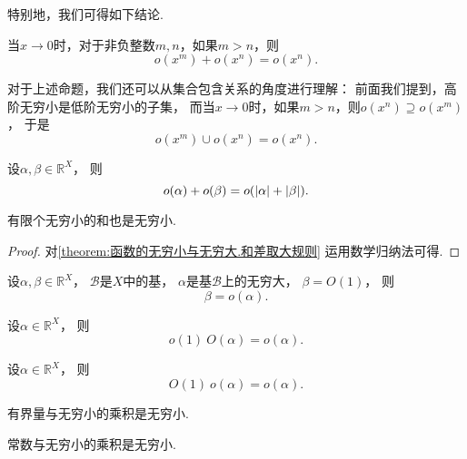 特别地，我们可得如下结论.
\begin{corollary}
当\(x\to0\)时，对于非负整数\(m,n\)，如果\(m>n\)，则\[
	o(x^m) + o(x^n) = o(x^n).
\]
\end{corollary}
\begin{remark}
对于上述命题，我们还可以从集合包含关系的角度进行理解：
前面我们提到，高阶无穷小是低阶无穷小的子集，
而当\(x\to0\)时，如果\(m>n\)，则\(o(x^n) \supseteq o(x^m)\)，
于是\[
	o(x^m) \cup o(x^n) = o(x^n).
\]
\end{remark}

\begin{proposition}
设\(\alpha,\beta\in\mathbb{R}^X\)，
则\[
	o(\alpha) + o(\beta) = o(\abs{\alpha} + \abs{\beta}).
\]
\end{proposition}
\begin{theorem}
有限个无穷小的和也是无穷小.
\begin{proof}
对\cref{theorem:函数的无穷小与无穷大.和差取大规则} 运用数学归纳法可得.
\end{proof}
\end{theorem}

\begin{proposition}
设\(\alpha,\beta\in\mathbb{R}^X\)，
\(\mathcal{B}\)是\(X\)中的基，
\(\alpha\)是基\(\mathcal{B}\)上的无穷大，
\(\beta=O(1)\)，
则\[
	\beta = o(\alpha).
\]
\end{proposition}
\begin{proposition}
设\(\alpha\in\mathbb{R}^X\)，
则\[
	o(1)~O(\alpha) = o(\alpha).
\]
\end{proposition}
\begin{proposition}
设\(\alpha\in\mathbb{R}^X\)，
则\[
	O(1)~o(\alpha) = o(\alpha).
\]
\end{proposition}
\begin{theorem}\label{theorem:函数极限.无穷小.有界函数与无穷小的乘积是无穷小}
有界量与无穷小的乘积是无穷小.
\end{theorem}

\begin{corollary}
常数与无穷小的乘积是无穷小.
\end{corollary}


